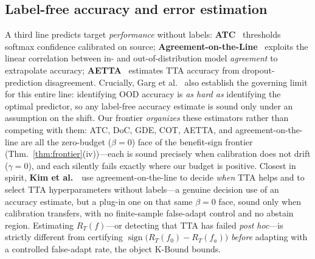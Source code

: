 \documentclass[conference]{IEEEtran}
\theoremstyle{plain}
\theoremstyle{definition}
\newcommand{\sign}{\operatorname{sign}}
\begin{document}
\subsection{Label-free accuracy and error estimation}
A third line predicts target \emph{performance} without labels: \textbf{ATC}~\cite{garg2022atc} thresholds
softmax confidence calibrated on source; \textbf{Agreement-on-the-Line}~\cite{baek2022aol,miller2021aol} exploits the linear
correlation between in- and out-of-distribution model \emph{agreement} to extrapolate
accuracy; \textbf{AETTA}~\cite{lee2024aetta} estimates TTA accuracy from dropout-prediction disagreement.
Crucially, Garg et al.~\cite{garg2022atc} also establish the governing limit for this entire
line: identifying OOD accuracy is \emph{as hard as} identifying the optimal predictor, so any
label-free accuracy estimate is sound only under an assumption on the shift. Our frontier
\emph{organizes} these estimators rather than competing with them: ATC, DoC, GDE, COT, AETTA,
and agreement-on-the-line are all the zero-budget ($\beta{=}0$) face of the benefit-sign frontier
(Thm.~\ref{thm:frontier}(iv))---each is sound precisely when calibration does not drift
($\gamma{=}0$), and each silently fails exactly where our budget is positive.
Closest in spirit, \textbf{Kim et al.}~\cite{kim2024taol}\ use agreement-on-the-line to decide \emph{when} TTA
helps and to select TTA hyperparameters without labels---a genuine decision use of an
accuracy estimate, but a plug-in one on that same $\beta{=}0$ face, sound only when calibration
transfers, with no finite-sample false-adapt control and no abstain region.
Estimating $R_T(f)$---or detecting that TTA has failed \emph{post hoc}---is strictly different
from certifying $\sign\big(R_T(f_0)-R_T(f_a)\big)$ \emph{before} adapting with a controlled
false-adapt rate, the object K-Bound bounds.
\end{document}
